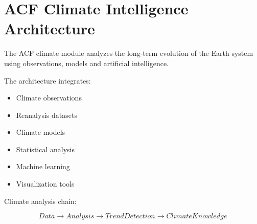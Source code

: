 \section{ACF Climate Intelligence Architecture}


The ACF climate module analyzes the long-term evolution of the
Earth system using observations, models and artificial
intelligence.



The architecture integrates:


\begin{itemize}

\item Climate observations

\item Reanalysis datasets

\item Climate models

\item Statistical analysis

\item Machine learning

\item Visualization tools

\end{itemize}



Climate analysis chain:


\begin{equation}
Data
\rightarrow
Analysis
\rightarrow
Trend Detection
\rightarrow
Climate Knowledge
\end{equation}
